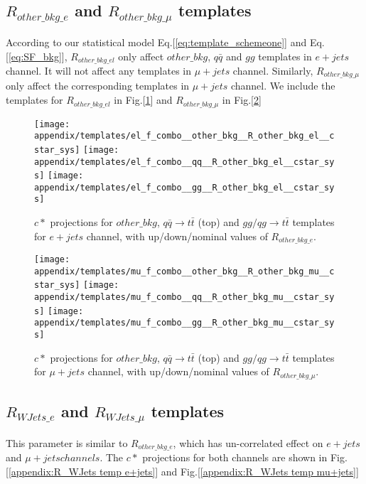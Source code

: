 \subsection{ $R_{other\_bkg\_e}$ and $R_{other\_bkg\_\mu}$ templates }
According to our statistical model Eq.[\ref{eq:template_schemeone}] and Eq.[\ref{eq:SF_bkg}], $R_{other\_bkg\_el}$ only affect $other\_bkg$, $q\bar q$ and $gg$ templates in $e+jets$ channel. It will not affect any templates in $\mu+jets$ channel. Similarly, $R_{other\_bkg\_\mu}$ only affect the corresponding templates in $\mu+jets$ channel. We include the templates for $R_{other\_bkg\_el}$ in Fig.[\ref{appendix:R_other_bkg temp e+jets}] and $R_{other\_bkg\_\mu}$ in Fig.[\ref{appendix:R_other_bkg temp mu+jets}]

\begin{figure}[hbt]
  \begin{center}
    \texttt{[image: appendix/templates/el\_f\_combo\_\_other\_bkg\_\_R\_other\_bkg\_el\_\_cstar\_sys]}
    \texttt{[image: appendix/templates/el\_f\_combo\_\_qq\_\_R\_other\_bkg\_el\_\_cstar\_sys]}
    \texttt{[image: appendix/templates/el\_f\_combo\_\_gg\_\_R\_other\_bkg\_el\_\_cstar\_sys]}
  \caption{\small $c*$ projections for $other\_bkg$,  $q\bar q \rightarrow t\bar t$ (top) and $gg/qg \rightarrow t\bar t$ templates for $e+jets$ channel, with up/down/nominal values of $R_{other\_bkg\_e}$.}
  \label{appendix:R_other_bkg temp e+jets}
  \end{center}
\end{figure}

\begin{figure}[hbt]
  \begin{center}
    \texttt{[image: appendix/templates/mu\_f\_combo\_\_other\_bkg\_\_R\_other\_bkg\_mu\_\_cstar\_sys]}
    \texttt{[image: appendix/templates/mu\_f\_combo\_\_qq\_\_R\_other\_bkg\_mu\_\_cstar\_sys]}
    \texttt{[image: appendix/templates/mu\_f\_combo\_\_gg\_\_R\_other\_bkg\_mu\_\_cstar\_sys]}
  \caption{\small $c*$ projections for $other\_bkg$,  $q\bar q \rightarrow t\bar t$ (top) and $gg/qg \rightarrow t\bar t$ templates for $\mu+jets$ channel, with up/down/nominal values of $R_{other\_bkg\_\mu}$.}
  \label{appendix:R_other_bkg temp mu+jets}
  \end{center}
\end{figure}

\subsection{$R_{WJets\_e}$ and $R_{WJets\_\mu}$ templates}
This parameter is similar to $R_{other\_bkg\_e}$, which has un-correlated effect on $e+jets$ and $\mu+jets channels$. The $c*$ projections for both channels are shown in Fig.[\ref{appendix:R_WJets temp e+jets}] and Fig.[\ref{appendix:R_WJets temp mu+jets}] 

